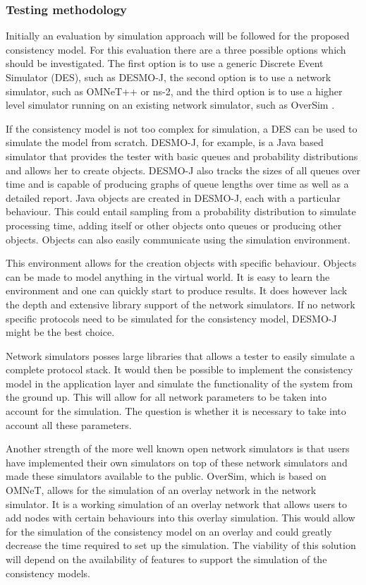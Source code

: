 \documentclass[journal,oneside,a4paper,onecolumn]{IEEEtran}
\begin{document}
\subsubsection{Testing methodology}
Initially an evaluation by simulation approach will be followed for the proposed consistency model. For this evaluation there are a three possible options which should be investigated. The first option is to use a generic Discrete Event Simulator (DES), such as DESMO-J, the second option is to use a network simulator, such as OMNeT++ or ns-2, and the third option is to use a higher level simulator running on an existing network simulator, such as OverSim \cite{OverSim_2007}.

If the consistency model is not too complex for simulation, a DES can be used to simulate the model from scratch. DESMO-J, for example, is a Java based simulator that provides the tester with basic queues and probability distributions and allows her to create objects. DESMO-J also tracks the sizes of all queues over time and is capable of producing graphs of queue lengths over time as well as a detailed report. Java objects are created in DESMO-J, each with a particular behaviour. This could entail sampling from a probability distribution to simulate processing time, adding itself or other objects onto queues or producing other objects. Objects can also easily communicate using the simulation environment.

This environment allows for the creation objects with specific behaviour. Objects can be made to model anything in the virtual world. It is easy to learn the environment and one can quickly start to produce results. It does however lack the depth and extensive library support of the network simulators. If no network specific protocols need to be simulated for the consistency model, DESMO-J might be the best choice.

Network simulators posses large libraries that allows a tester to easily simulate a complete protocol stack. It would then be possible to implement the consistency model in the application layer and simulate the functionality of the system from the ground up. This will allow for all network parameters to be taken into account for the simulation. The question is whether it is necessary to take into account all these parameters.

Another strength of the more well known open network simulators is that users have implemented their own simulators on top of these network simulators and made these simulators available to the public. OverSim, which is based on OMNeT, allows for the simulation of an overlay network in the network simulator. It is a working simulation of an overlay network that allows users to add nodes with certain behaviours into this overlay simulation. This would allow for the simulation of the consistency model on an overlay and could greatly decrease the time required to set up the simulation. The viability of this solution will depend on the availability of features to support the simulation of the consistency models.
\end{document}
